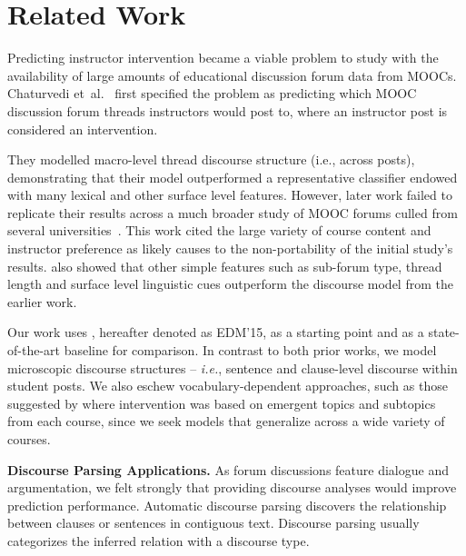 \documentclass[letterpaper]{article}
\begin{document}
\section{Related Work} 
\label{sect:related}

Predicting instructor intervention became a viable problem to
study with the availability of large amounts of educational discussion 
forum data from MOOCs. Chaturvedi et~al.~ 
first specified the problem as predicting which MOOC discussion forum threads 
instructors would post to, where an instructor post is considered 
an intervention.

They modelled macro-level thread discourse structure (i.e.,
across posts), demonstrating that their model outperformed a
representative classifier endowed with many lexical and other
surface level features. However, later work failed to replicate their 
results across a much broader study of MOOC forums culled from several 
universities~\cite{chandrasekaran2015learning}. This work cited the 
large variety of course content and instructor preference as likely 
causes to the non-portability of the initial study's results. 
\citeauthor{chandrasekaran2015learning} also showed that other simple 
features such as sub-forum type, thread length and surface level 
linguistic cues outperform the discourse model from the earlier work.

Our work uses \citeauthor{chandrasekaran2015learning}
, hereafter denoted as EDM'15,
as a starting point and as a state-of-the-art baseline for comparison.
In contrast to both prior works, we model microscopic discourse
structures -- {\it i.e.}, sentence and clause-level discourse within
student posts. We also eschew vocabulary-dependent approaches, such as
those suggested by \citeauthor{ramesh2015} 
where intervention was based on emergent topics and
subtopics 
from each course, since we seek models that generalize across a wide
variety of courses.

\textbf{Discourse Parsing Applications.} As forum discussions feature
dialogue and argumentation, we felt strongly that providing discourse
analyses would improve prediction performance. Automatic discourse
parsing discovers the relationship between clauses or sentences in
contiguous text. Discourse parsing usually categorizes the inferred 
relation with a discourse type.
\end{document}
